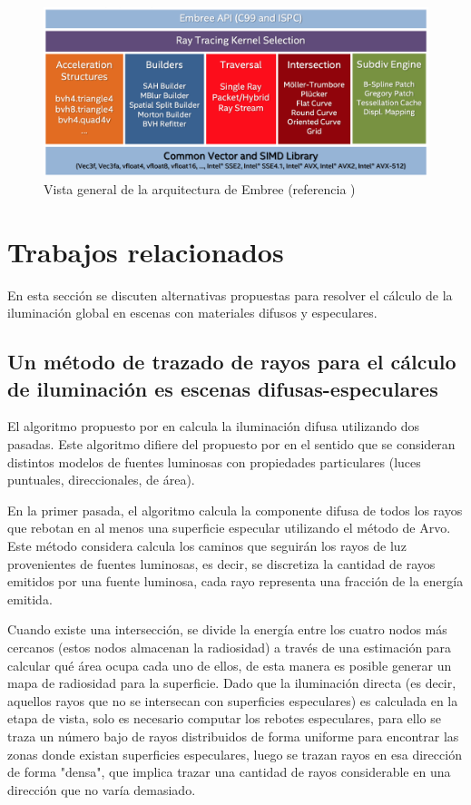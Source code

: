 \vspace{5mm}
\begin{figure}[H]
	\centering
	\includegraphics[width=.8\linewidth]{assets/embree}
	\caption{Vista general de la arquitectura de Embree (referencia \cite{embree})}
	\label{img:embree}
\end{figure}

\section{Trabajos relacionados}

En esta sección se discuten alternativas propuestas para resolver el cálculo de la iluminación global en escenas con materiales difusos y especulares.

\subsection{Un método de trazado de rayos para el cálculo de iluminación es escenas difusas-especulares}

El algoritmo propuesto por \citeauthor{Shirley} en \citeyear{Shirley} calcula la iluminación difusa utilizando dos pasadas. Este algoritmo difiere del propuesto por \citeauthor{Sillion} en el sentido que se consideran distintos modelos de fuentes luminosas con propiedades particulares (luces puntuales, direccionales, de área).

En la primer pasada, el algoritmo calcula la componente difusa de todos los rayos que rebotan en al menos una superficie especular utilizando el método de Arvo. Este método considera calcula los caminos que seguirán los rayos de luz provenientes de fuentes luminosas, es decir, se discretiza la cantidad de rayos emitidos por una fuente luminosa, cada rayo representa una fracción de la energía emitida.

Cuando existe una intersección, se divide la energía entre los cuatro nodos más cercanos (estos nodos almacenan la radiosidad) a través de una estimación para calcular qué área ocupa cada uno de ellos, de esta manera es posible generar un mapa de radiosidad para la superficie. Dado que la iluminación directa (es decir, aquellos rayos que no se intersecan con superficies especulares) es calculada en la etapa de vista, solo es necesario computar los rebotes especulares, para ello se traza un número bajo de rayos distribuidos de forma uniforme para encontrar las zonas donde existan superficies especulares, luego se trazan rayos en esa dirección de forma "densa", que implica trazar una cantidad de rayos considerable en una dirección que no varía demasiado.

